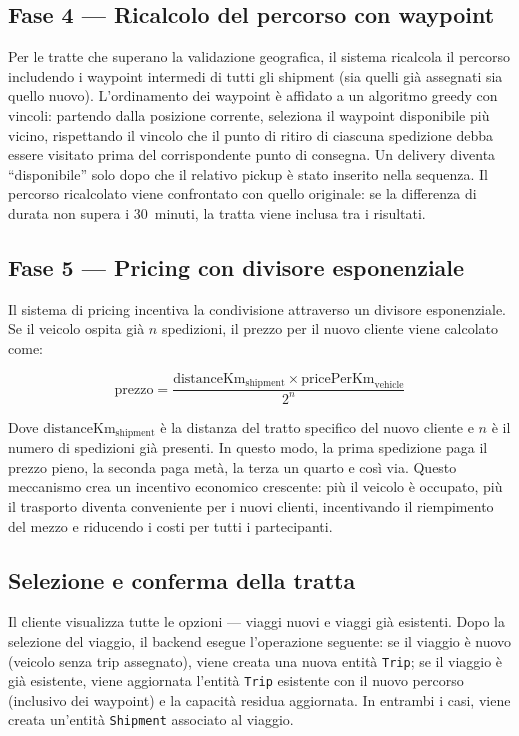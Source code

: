 \subsection{Fase 4 --- Ricalcolo del percorso con waypoint}

Per le tratte che superano la validazione geografica, il sistema ricalcola il percorso includendo i waypoint intermedi di tutti gli shipment (sia quelli già assegnati sia quello nuovo). L'ordinamento dei waypoint è affidato a un algoritmo greedy con vincoli: partendo dalla posizione corrente, seleziona il waypoint disponibile più vicino, rispettando il vincolo che il punto di ritiro di ciascuna spedizione debba essere visitato prima del corrispondente punto di consegna. Un delivery diventa ``disponibile'' solo dopo che il relativo pickup è stato inserito nella sequenza. Il percorso ricalcolato viene confrontato con quello originale: se la differenza di durata non supera i 30~minuti, la tratta viene inclusa tra i risultati.

\subsection{Fase 5 --- Pricing con divisore esponenziale}

Il sistema di pricing incentiva la condivisione attraverso un divisore esponenziale. Se il veicolo ospita già $n$ spedizioni, il prezzo per il nuovo cliente viene calcolato come:

\begin{equation}
\label{eq:pricing}
\text{prezzo} = \frac{\text{distanceKm}_{\text{shipment}} \times \text{pricePerKm}_{\text{vehicle}}}{2^n}
\end{equation}

Dove $\text{distanceKm}_{\text{shipment}}$ è la distanza del tratto specifico del nuovo cliente e $n$ è il numero di spedizioni già presenti. In questo modo, la prima spedizione paga il prezzo pieno, la seconda paga metà, la terza un quarto e così via. Questo meccanismo crea un incentivo economico crescente: più il veicolo è occupato, più il trasporto diventa conveniente per i nuovi clienti, incentivando il riempimento del mezzo e riducendo i costi per tutti i partecipanti.

\subsection{Selezione e conferma della tratta}

Il cliente visualizza tutte le opzioni --- viaggi nuovi e viaggi già esistenti. 
Dopo la selezione del viaggio, il backend esegue l'operazione seguente: se il viaggio è nuovo (veicolo senza trip assegnato), viene creata una nuova entità \texttt{Trip}; 
se il viaggio è già esistente, viene aggiornata l'entità \texttt{Trip} esistente con il nuovo percorso (inclusivo dei waypoint) e la capacità residua aggiornata. In entrambi i casi, viene creata un'entità \texttt{Shipment} associato al viaggio.

